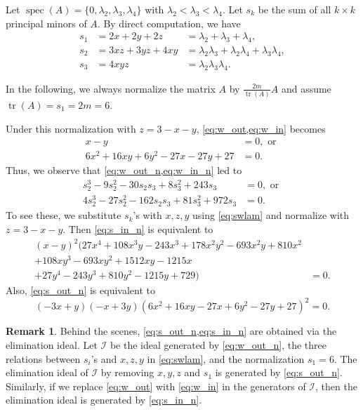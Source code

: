 \documentclass{article}
\theoremstyle{definition}
\newtheorem{remark}[theorem]{Remark}
\newcommand{\tr}{\operatorname{tr}}
\newcommand{\spec}{\operatorname{spec}}
\begin{document}
Let $\spec(A) = \{0, \lambda_2, \lambda_3, \lambda_4\}$ with $\lambda_2 < \lambda_3 < \lambda_4$.  Let $s_k$ be the sum of all $k\times k$ principal minors of $A$.  By direct computation, we have 
\begin{equation}
\label{eq:swlam}
    \begin{array}{rll}
        s_1 &= 2x + 2y + 2z &= \lambda_2 + \lambda_3 + \lambda_4, \\
        s_2 &= 3xz + 3yz + 4xy &= \lambda_2\lambda_3 + \lambda_2\lambda_4 + \lambda_3\lambda_4, \\
        s_3 &= 4xyz &= \lambda_2\lambda_3\lambda_4.
    \end{array}
\end{equation}

In the following, we always normalize the matrix $A$ by $\frac{2m}{\tr(A)}A$ and assume $\tr(A) = s_1 = 2m = 6$.  

Under this normalization with $z = 3 - x - y$, \cref{eq:w_out,eq:w_in} becomes 
\begin{align}
    x - y &= 0, \text{ or } \label{eq:w_out_n} \\
    6x^2 + 16xy + 6y^2 - 27x - 27y + 27 &= 0. \label{eq:w_in_n}
\end{align}
Thus, we observe that \cref{eq:w_out_n,eq:w_in_n} led to 
\begin{align}
    s_2^3 - 9s_2^2 - 30s_2s_3 + 8s_3^2 + 243s_3 &= 0, \text{ or } \label{eq:s_out_n} \\
    4s_2^3 - 27s_2^2 - 162s_2s_3 + 81s_3^2 + 972s_3 &= 0. \label{eq:s_in_n}
\end{align}
To see these, we substitute $s_k$'s with $x,z,y$ using \cref{eq:swlam} and normalize with $z = 3 - x - y$.  Then \cref{eq:s_in_n} is equivalent to 
\begin{equation}
\label{eq:rel_out_n}
\begin{aligned}
    (x - y)^2  (27x^4 + 108x^3y - 243x^3 + 178x^2y^2 - 693x^2y + 810x^2 & \\
    + 108xy^3 - 693xy^2 + 1512xy - 1215x & \\
    + 27y^4 - 243y^3 + 810y^2 - 1215y + 729) &= 0.
\end{aligned}
\end{equation}
Also, \cref{eq:s_out_n} is equivalent to
\begin{equation}
\label{eq:rel_in_n}
    (-3x + y)  (-x + 3y)  (6x^2 + 16xy - 27x + 6y^2 - 27y + 27)^2 = 0.    
\end{equation}

\begin{remark}
Behind the scenes, \cref{eq:s_out_n,eq:s_in_n} are obtained via the elimination ideal.  Let $\mathcal{I}$ be the ideal generated by \cref{eq:w_out_n}, the three relations between $s_i$'s and $x,z,y$ in \cref{eq:swlam}, and the normalization $s_1 = 6$.  The elimination ideal of $\mathcal{I}$ by removing $x,y,z$ and $s_1$ is generated by \cref{eq:s_out_n}.  Similarly, if we replace \cref{eq:w_out} with \cref{eq:w_in} in the generators of $\mathcal{I}$, then the elimination ideal is generated by \cref{eq:s_in_n}.
\end{remark}
\end{document}
